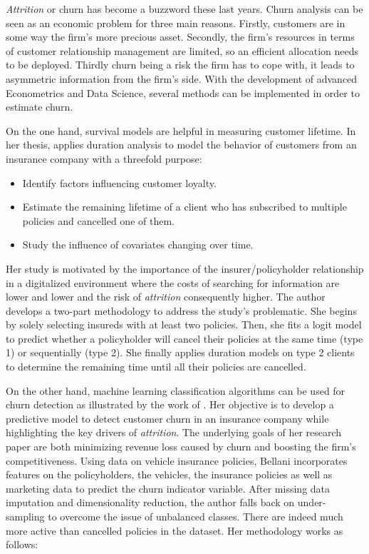 \documentclass[
]{book}
\providecommand{\tightlist}{%
  \setlength{\itemsep}{0pt}\setlength{\parskip}{0pt}}
\begin{document}
\emph{Attrition} or churn has become a buzzword these last years. Churn analysis can be seen as an economic problem for three main reasons. Firstly, customers are in some way the firm's more precious asset. Secondly, the firm's resources in terms of customer relationship management are limited, so an efficient allocation needs to be deployed. Thirdly churn being a risk the firm has to cope with, it leads to asymmetric information from the firm's side. With the development of advanced Econometrics and Data Science, several methods can be implemented in order to estimate churn.

On the one hand, survival models are helpful in measuring customer lifetime. In her thesis, \citet{SURV_METHODS_INSURANCE} applies duration analysis to model the behavior of customers from an insurance company with a threefold purpose:

\begin{itemize}
\tightlist
\item
  Identify factors influencing customer loyalty.
\item
  Estimate the remaining lifetime of a client who has subscribed to multiple policies and cancelled one of them.
\item
  Study the influence of covariates changing over time.
\end{itemize}

Her study is motivated by the importance of the insurer/policyholder relationship in a digitalized environment where the costs of searching for information are lower and lower and the risk of \emph{attrition} consequently higher. The author develops a two-part methodology to address the study's problematic. She begins by solely selecting insureds with at least two policies. Then, she fits a logit model to predict whether a policyholder will cancel their policies at the same time (type 1) or sequentially (type 2). She finally applies duration models on type 2 clients to determine the remaining time until all their policies are cancelled.

On the other hand, machine learning classification algorithms can be used for churn detection as illustrated by the work of \citet{CHURN_INSURANCE}. Her objective is to develop a predictive model to detect customer churn in an insurance company while highlighting the key drivers of \emph{attrition}. The underlying goals of her research paper are both minimizing revenue loss caused by churn and boosting the firm's competitiveness. Using data on vehicle insurance policies, Bellani incorporates features on the policyholders, the vehicles, the insurance policies as well as marketing data to predict the churn indicator variable. After missing data imputation and dimensionality reduction, the author falls back on under-sampling to overcome the issue of unbalanced classes. There are indeed much more active than cancelled policies in the dataset. Her methodology works as follows:
\end{document}
